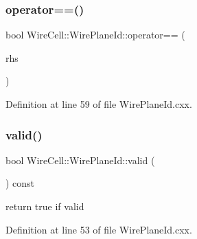 \subsubsection{\texorpdfstring{operator==()}{operator==()}}
{\footnotesize\ttfamily bool Wire\+Cell\+::\+Wire\+Plane\+Id\+::operator== (\begin{DoxyParamCaption}\item[{const \hyperlink{class_wire_cell_1_1_wire_plane_id}{Wire\+Plane\+Id} \&}]{rhs }\end{DoxyParamCaption})}



Definition at line 59 of file Wire\+Plane\+Id.\+cxx.

\mbox{\label{class_wire_cell_1_1_wire_plane_id_a617a3b37d14485b685db0762be14bec4}} 
\subsubsection{\texorpdfstring{valid()}{valid()}}
{\footnotesize\ttfamily bool Wire\+Cell\+::\+Wire\+Plane\+Id\+::valid (\begin{DoxyParamCaption}{ }\end{DoxyParamCaption}) const}



return true if valid 



Definition at line 53 of file Wire\+Plane\+Id.\+cxx.

